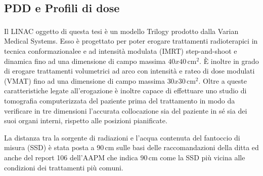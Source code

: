 \subsection{PDD e Profili di dose}
Il LINAC oggetto di questa tesi è un modello Trilogy\textsuperscript{\textcopyright} prodotto dalla Varian Medical Systems. Esso è progettato per poter erogare trattamenti radioterapici in tecnica conformazionalee e ad intensità modulata (IMRT) step-and-shoot e dinamica fino ad una dimensione di campo massima $40x40\,$cm$^2$. \`E inoltre in grado di erogare trattamenti volumetrici ad arco con intensità e rateo di dose modulati (VMAT) fino ad una dimensione di campo massima $30x30\,$cm$^2$. Oltre a queste caratteristiche legate all'erogazione è inoltre capace di effettuare uno studio di tomografia computerizzata del paziente prima del trattamento in modo da verificare in tre dimensioni l'accurata collocazione sia del paziente in sé sia dei suoi organi interni, rispetto alle posizioni pianificate.

La distanza tra la sorgente di radiazioni e l'acqua contenuta del fantoccio di misura (SSD) è stata posta a $90\,$cm sulle basi delle raccomandazioni della ditta ed anche del report 106 dell'AAPM \cite{Das2008a} che indica $90\,$cm come la SSD più vicina alle condizioni dei trattamenti più comuni.

